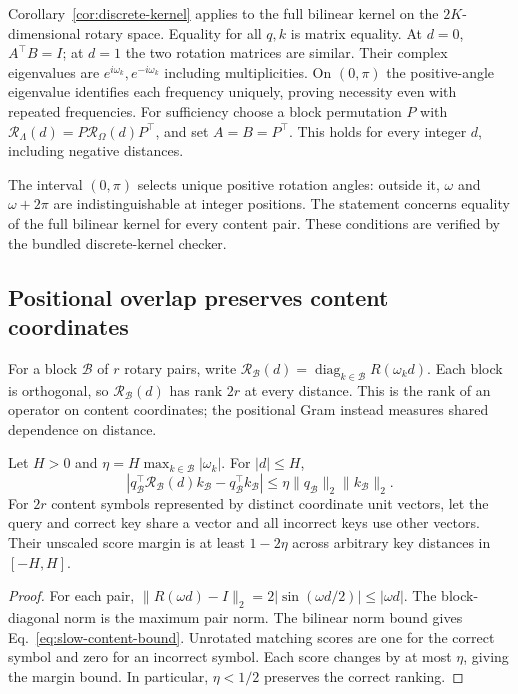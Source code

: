 Corollary~\ref{cor:discrete-kernel} applies to the full bilinear kernel on the
$2K$-dimensional rotary space. Equality for all $q,k$ is matrix equality.
At $d=0$, $A^\top B=I$; at $d=1$ the two rotation matrices are similar.
Their complex eigenvalues are $e^{i\omega_k},e^{-i\omega_k}$ including
multiplicities. On $(0,\pi)$ the positive-angle eigenvalue identifies each
frequency uniquely, proving necessity even with repeated frequencies.
For sufficiency choose a block permutation $P$ with
$\mathcal R_\Lambda(d)=P\mathcal R_\Omega(d)P^\top$, and set
$A=B=P^\top$. This holds for every integer $d$, including negative distances.


The interval $(0,\pi)$ selects unique positive rotation angles: outside it,
$\omega$ and $\omega+2\pi$ are indistinguishable at integer positions.
The statement concerns equality of the full bilinear kernel for every content
pair. These conditions are verified by the bundled discrete-kernel checker.
\subsection{Positional overlap preserves content coordinates}
\label{sec:content-coordinate-retention}
For a block $\mathcal B$ of $r$ rotary pairs, write
$\mathcal R_{\mathcal B}(d)=\operatorname{diag}_{k\in\mathcal B}R(\omega_kd)$.
Each block is orthogonal, so $\mathcal R_{\mathcal B}(d)$ has rank $2r$ at
every distance. This is the rank of an operator on content coordinates;
the positional Gram instead measures shared dependence on distance.

\begin{proposition}
\label{prop:slow-content-matching}
Let $H>0$ and $\eta=H\max_{k\in\mathcal B}|\omega_k|$. For $|d|\le H$,
\begin{equation}
\left|q_{\mathcal B}^{\top}\mathcal R_{\mathcal B}(d)k_{\mathcal B}
-q_{\mathcal B}^{\top}k_{\mathcal B}\right|
\le\eta\|q_{\mathcal B}\|_2\|k_{\mathcal B}\|_2.
\label{eq:slow-content-bound}
\end{equation}
For $2r$ content symbols represented by distinct coordinate unit vectors,
let the query and correct key share a vector and all incorrect keys use
other vectors. Their unscaled score margin is at least $1-2\eta$ across
arbitrary key distances in $[-H,H]$.
\end{proposition}

\begin{proof}
For each pair,
$\|R(\omega d)-I\|_2=2|\sin(\omega d/2)|\le|\omega d|$.
The block-diagonal norm is the maximum pair norm. The bilinear norm bound
gives Eq.~\eqref{eq:slow-content-bound}. Unrotated matching scores are one
for the correct symbol and zero for an incorrect symbol. Each score
changes by at most $\eta$, giving the margin bound. In particular,
$\eta<1/2$ preserves the correct ranking.
\end{proof}

